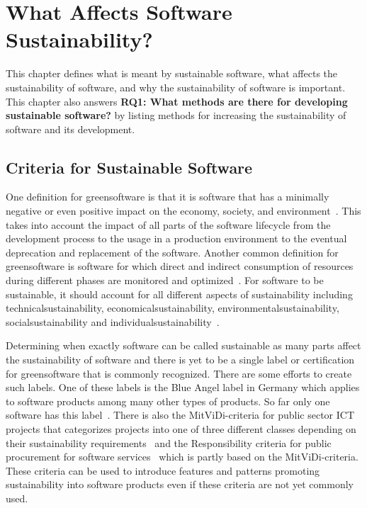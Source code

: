 \chapter{What Affects Software Sustainability?}\label{chapter2}
This chapter defines what is meant by sustainable software, what affects the sustainability of software, and why the sustainability of software is important. This chapter also answers \textbf{RQ1: What methods are there for developing sustainable software?} by listing methods for increasing the sustainability of software and its development.

\section{Criteria for Sustainable Software}\label{criteria}
One definition for \gls{greensoftware} is that it is software that has a minimally negative or even positive impact on the economy, society, and environment~\cite{modelforselected}. This takes into account the impact of all parts of the software lifecycle from the development process to the usage in a production environment to the eventual deprecation and replacement of the software. Another common definition for \gls{greensoftware} is software for which direct and indirect consumption of resources during different phases are monitored and optimized~\cite{sustainabledevelopmentsustainablesoftware}. For software to be sustainable, it should account for all different aspects of sustainability including \gls{technicalsustainability}, \gls{economicalsustainability}, \gls{environmentalsustainability}, \gls{socialsustainability} and \gls{individualsustainability}~\cite{Calero2015}.

Determining when exactly software can be called sustainable as many parts affect the sustainability of software and there is yet to be a single label or certification for \gls{greensoftware} that is commonly recognized. There are some efforts to create such labels. One of these labels is the Blue Angel label in Germany which applies to software products among many other types of products. So far only one software has this label~\cite{blauerengelBlueAngel}. There is also the MitViDi-criteria for public sector ICT projects that categorizes projects into one of three different classes depending on their sustainability requirements~\cite{mitvidi} and the Responsibility criteria for public procurement for software services~\cite{kriteeripankkiSoftwareServices} which is partly based on the MitViDi-criteria. These criteria can be used to introduce features and patterns promoting sustainability into software products even if these criteria are not yet commonly used.

